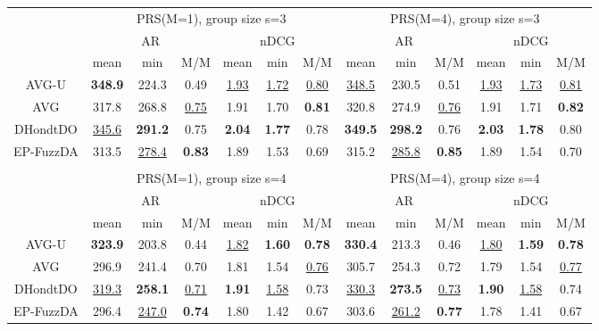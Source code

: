 \begin{tabular}{ c | c c c | c c c || c c c | c c c }

\multicolumn{1}{c}{} & \multicolumn{6}{c}{PRS(M=1), group size s=3} & \multicolumn{6}{c}{PRS(M=4), group size s=3} \\
\multicolumn{1}{c}{} & \multicolumn{3}{c}{AR} & \multicolumn{3}{c}{nDCG} & \multicolumn{3}{c}{AR} & \multicolumn{3}{c}{nDCG} \\
& mean & min & M/M & mean & min & M/M & mean & min & M/M & mean & min & M/M \\
\hline
AVG-U & \textbf{348.9} & 224.3 & 0.49 & \underline{1.93} & \underline{1.72} & \underline{0.80} & \underline{348.5} & 230.5 & 0.51 & \underline{1.93} & \underline{1.73} & \underline{0.81} \\
AVG & 317.8 & 268.8 & \underline{0.75} & 1.91 & 1.70 & \textbf{0.81} & 320.8 & 274.9 & \underline{0.76} & 1.91 & 1.71 & \textbf{0.82} \\
DHondtDO & \underline{345.6} & \textbf{291.2} & 0.75 & \textbf{2.04} & \textbf{1.77} & 0.78 & \textbf{349.5} & \textbf{298.2} & 0.76 & \textbf{2.03} & \textbf{1.78} & 0.80 \\
EP-FuzzDA & 313.5 & \underline{278.4} & \textbf{0.83} & 1.89 & 1.53 & 0.69 & 315.2 & \underline{285.8} & \textbf{0.85} & 1.89 & 1.54 & 0.70 \\

\multicolumn{12}{c}{} \\
\multicolumn{1}{c}{} & \multicolumn{6}{c}{PRS(M=1), group size s=4} & \multicolumn{6}{c}{PRS(M=4), group size s=4} \\
\multicolumn{1}{c}{} & \multicolumn{3}{c}{AR} & \multicolumn{3}{c}{nDCG} & \multicolumn{3}{c}{AR} & \multicolumn{3}{c}{nDCG} \\
& mean & min & M/M & mean & min & M/M & mean & min & M/M & mean & min & M/M \\
\hline
AVG-U & \textbf{323.9} & 203.8 & 0.44 & \underline{1.82} & \textbf{1.60} & \textbf{0.78} & \textbf{330.4} & 213.3 & 0.46 & \underline{1.80} & \textbf{1.59} & \textbf{0.78} \\
AVG & 296.9 & 241.4 & 0.70 & 1.81 & 1.54 & \underline{0.76} & 305.7 & 254.3 & 0.72 & 1.79 & 1.54 & \underline{0.77} \\
DHondtDO & \underline{319.3} & \textbf{258.1} & \underline{0.71} & \textbf{1.91} & \underline{1.58} & 0.73 & \underline{330.3} & \textbf{273.5} & \underline{0.73} & \textbf{1.90} & \underline{1.58} & 0.74 \\
EP-FuzzDA & 296.4 & \underline{247.0} & \textbf{0.74} & 1.80 & 1.42 & 0.67 & 303.6 & \underline{261.2} & \textbf{0.77} & 1.78 & 1.41 & 0.67 \\


\end{tabular}
